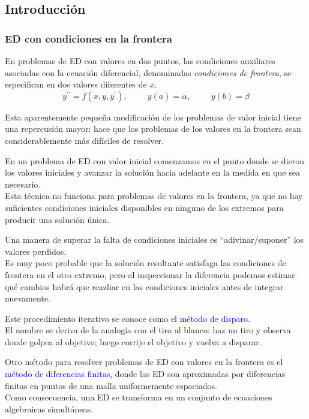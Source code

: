 \subsection{Introducción}
\begin{frame}
\frametitle{ED con condiciones en la frontera}
En problemas de ED con valores en dos puntos, las condiciones auxiliares asociadas con la ecuación diferencial, denominadas \emph{condiciones de frontera}, se especifican en dos valores diferentes de $x$.
\[  y^{\prime \prime} = f(x, y, y^{\prime}), \hspace{1cm} y(a) = \alpha, \hspace{1cm} y(b) = \beta \]
\end{frame}
\begin{frame}
Esta aparentemente pequeña modificación de los problemas de valor inicial tiene una repercusión mayor: hace que los problemas de los valores en la frontera sean considerablemente más difíciles de resolver.
\end{frame}
\begin{frame}
En un problema de ED con valor inicial comenzamos en el punto donde se dieron los valores iniciales y avanzar la solución hacia adelante en la medida en que sea necesario.
\\
\bigskip
Esta técnica no funciona para problemas de valores en la frontera, ya que no hay suficientes condiciones iniciales disponibles en ninguno de los extremos para producir una solución única.
\end{frame}
\begin{frame}
Una manera de superar la falta de condiciones iniciales es \enquote{adivinar/suponer} los valores perdidos.
\\
\bigskip
Es muy poco probable que la solución resultante satisfaga las condiciones de frontera en el otro extremo, pero al inspeccionar la diferencia podemos estimar qué cambios habrá que reazliar en las condiciones iniciales antes de integrar nuevamente.
\end{frame}
\begin{frame}
Este procedimiento iterativo se conoce como el \textcolor{blue}{método de disparo}. 
\\
\bigskip
El nombre se deriva de la analogía con el tiro al blanco: haz un tiro y observa donde golpea al objetivo; luego corrije el objetivo y vuelva a disparar.
\end{frame}
\begin{frame}
Otro método para resolver problemas de ED con valores en la frontera es el \textcolor{blue}{método de diferencias finitas}, donde las ED son aproximadas por diferencias finitas en puntos de una malla uniformemente espaciados.
\\
\bigskip
Como consecuencia, una ED se transforma en un conjunto de ecuaciones algebraicas simultáneas.
\end{frame}

